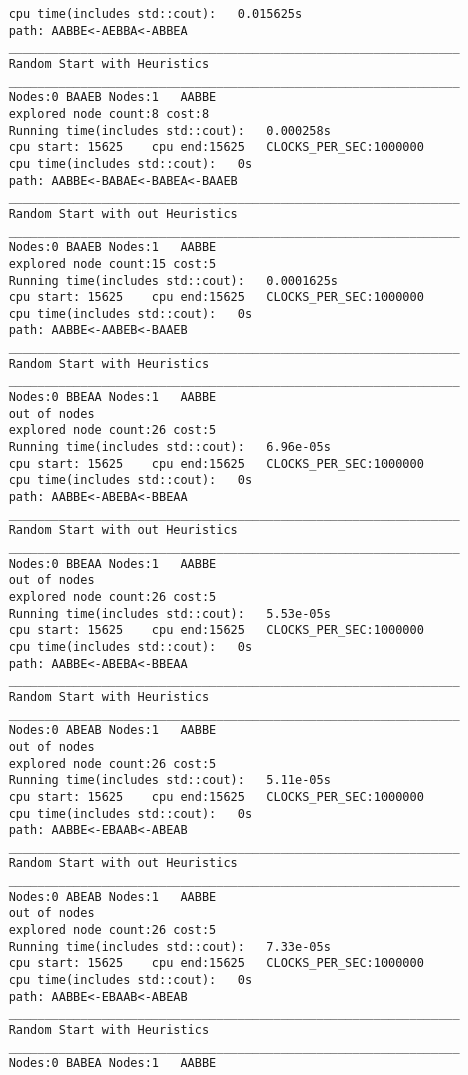 \documentclass[12pt]{article}
\begin{document}
\begin{lstlisting}
	cpu time(includes std::cout):	0.015625s
	path: AABBE<-AEBBA<-ABBEA
	_______________________________________________________________
	Random Start with Heuristics
	_______________________________________________________________
	Nodes:0	BAAEB Nodes:1	AABBE
	explored node count:8 cost:8
	Running time(includes std::cout):	0.000258s
	cpu start: 15625	cpu end:15625	CLOCKS_PER_SEC:1000000
	cpu time(includes std::cout):	0s
	path: AABBE<-BABAE<-BABEA<-BAAEB
	_______________________________________________________________
	Random Start with out Heuristics
	_______________________________________________________________
	Nodes:0	BAAEB Nodes:1	AABBE
	explored node count:15 cost:5
	Running time(includes std::cout):	0.0001625s
	cpu start: 15625	cpu end:15625	CLOCKS_PER_SEC:1000000
	cpu time(includes std::cout):	0s
	path: AABBE<-AABEB<-BAAEB
	_______________________________________________________________
	Random Start with Heuristics
	_______________________________________________________________
	Nodes:0	BBEAA Nodes:1	AABBE
	out of nodes
	explored node count:26 cost:5
	Running time(includes std::cout):	6.96e-05s
	cpu start: 15625	cpu end:15625	CLOCKS_PER_SEC:1000000
	cpu time(includes std::cout):	0s
	path: AABBE<-ABEBA<-BBEAA
	_______________________________________________________________
	Random Start with out Heuristics
	_______________________________________________________________
	Nodes:0	BBEAA Nodes:1	AABBE
	out of nodes
	explored node count:26 cost:5
	Running time(includes std::cout):	5.53e-05s
	cpu start: 15625	cpu end:15625	CLOCKS_PER_SEC:1000000
	cpu time(includes std::cout):	0s
	path: AABBE<-ABEBA<-BBEAA
	_______________________________________________________________
	Random Start with Heuristics
	_______________________________________________________________
	Nodes:0	ABEAB Nodes:1	AABBE
	out of nodes
	explored node count:26 cost:5
	Running time(includes std::cout):	5.11e-05s
	cpu start: 15625	cpu end:15625	CLOCKS_PER_SEC:1000000
	cpu time(includes std::cout):	0s
	path: AABBE<-EBAAB<-ABEAB
	_______________________________________________________________
	Random Start with out Heuristics
	_______________________________________________________________
	Nodes:0	ABEAB Nodes:1	AABBE
	out of nodes
	explored node count:26 cost:5
	Running time(includes std::cout):	7.33e-05s
	cpu start: 15625	cpu end:15625	CLOCKS_PER_SEC:1000000
	cpu time(includes std::cout):	0s
	path: AABBE<-EBAAB<-ABEAB
	_______________________________________________________________
	Random Start with Heuristics
	_______________________________________________________________
	Nodes:0	BABEA Nodes:1	AABBE

\end{lstlisting}
\end{document}
